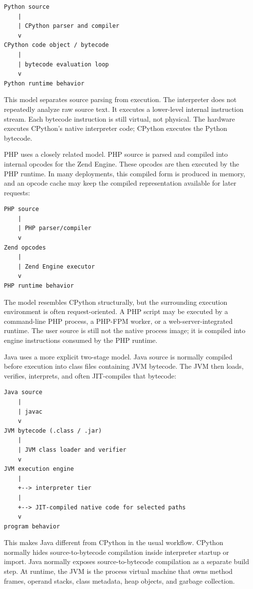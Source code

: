 \documentclass[a4paper,twoside]{report}
\begin{document}
\begin{verbatim}
Python source
    |
    | CPython parser and compiler
    v
CPython code object / bytecode
    |
    | bytecode evaluation loop
    v
Python runtime behavior
\end{verbatim}

This model separates source parsing from execution. The interpreter does not repeatedly analyze raw source text. It executes a lower-level internal instruction stream. Each bytecode instruction is still virtual, not physical. The hardware executes CPython's native interpreter code; CPython executes the Python bytecode.

PHP uses a closely related model. PHP source is parsed and compiled into internal opcodes for the Zend Engine. These opcodes are then executed by the PHP runtime. In many deployments, this compiled form is produced in memory, and an opcode cache may keep the compiled representation available for later requests:

\begin{verbatim}
PHP source
    |
    | PHP parser/compiler
    v
Zend opcodes
    |
    | Zend Engine executor
    v
PHP runtime behavior
\end{verbatim}

The model resembles CPython structurally, but the surrounding execution environment is often request-oriented. A PHP script may be executed by a command-line PHP process, a PHP-FPM worker, or a web-server-integrated runtime. The user source is still not the native process image; it is compiled into engine instructions consumed by the PHP runtime.

Java uses a more explicit two-stage model. Java source is normally compiled before execution into class files containing JVM bytecode. The JVM then loads, verifies, interprets, and often JIT-compiles that bytecode:

\begin{verbatim}
Java source
    |
    | javac
    v
JVM bytecode (.class / .jar)
    |
    | JVM class loader and verifier
    v
JVM execution engine
    |
    +--> interpreter tier
    |
    +--> JIT-compiled native code for selected paths
    v
program behavior
\end{verbatim}

This makes Java different from CPython in the usual workflow. CPython normally hides source-to-bytecode compilation inside interpreter startup or import. Java normally exposes source-to-bytecode compilation as a separate build step. At runtime, the JVM is the process virtual machine that owns method frames, operand stacks, class metadata, heap objects, and garbage collection.
\end{document}
